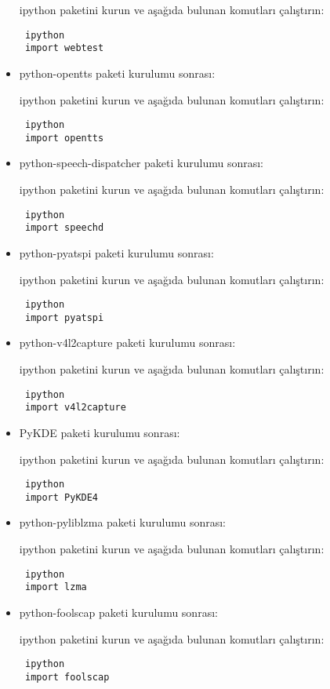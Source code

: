 \documentclass[a4paper,10pt]{article}
\begin{document}
\begin{itemize}
ipython paketini kurun ve aşağıda bulunan komutları çalıştırın:
\begin{verbatim}
 ipython
 import webtest
\end{verbatim}


\item python-opentts paketi kurulumu sonrası:

ipython paketini kurun ve aşağıda bulunan komutları çalıştırın:
\begin{verbatim}
 ipython
 import opentts
\end{verbatim}

\item python-speech-dispatcher paketi kurulumu sonrası:

ipython paketini kurun ve aşağıda bulunan komutları çalıştırın:
\begin{verbatim}
 ipython
 import speechd
\end{verbatim}

\item python-pyatspi paketi kurulumu sonrası:

ipython paketini kurun ve aşağıda bulunan komutları çalıştırın:
\begin{verbatim}
 ipython
 import pyatspi
\end{verbatim}

\item python-v4l2capture paketi kurulumu sonrası:

ipython paketini kurun ve aşağıda bulunan komutları çalıştırın:
\begin{verbatim}
 ipython
 import v4l2capture
\end{verbatim}

\item PyKDE paketi kurulumu sonrası:

ipython paketini kurun ve aşağıda bulunan komutları çalıştırın:
\begin{verbatim}
 ipython
 import PyKDE4
\end{verbatim}

\item python-pyliblzma paketi kurulumu sonrası:

ipython paketini kurun ve aşağıda bulunan komutları çalıştırın:
\begin{verbatim}
 ipython
 import lzma
\end{verbatim}

\item python-foolscap paketi kurulumu sonrası:

ipython paketini kurun ve aşağıda bulunan komutları çalıştırın:
\begin{verbatim}
 ipython
 import foolscap
\end{verbatim}


\end{itemize}
\end{document}
